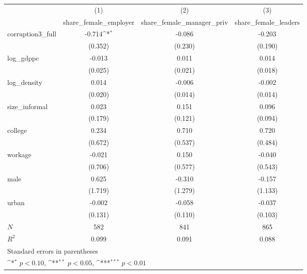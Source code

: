 {
\def\sym#1{\ifmmode^{#1}\else\(^{#1}\)\fi}
\begin{tabular}{l*{3}{c}}
\hline\hline
            &\multicolumn{1}{c}{(1)}&\multicolumn{1}{c}{(2)}&\multicolumn{1}{c}{(3)}\\
            &\multicolumn{1}{c}{share\_female\_employer}&\multicolumn{1}{c}{share\_female\_manager\_priv}&\multicolumn{1}{c}{share\_female\_leaders}\\
\hline
corruption3\_full&      -0.714\sym{*}  &      -0.086         &      -0.203         \\
            &     (0.352)         &     (0.230)         &     (0.190)         \\
[1em]
log\_gdppc   &      -0.013         &       0.011         &       0.014         \\
            &     (0.025)         &     (0.021)         &     (0.018)         \\
[1em]
log\_density &       0.014         &      -0.006         &      -0.002         \\
            &     (0.020)         &     (0.014)         &     (0.014)         \\
[1em]
size\_informal&       0.023         &       0.151         &       0.096         \\
            &     (0.179)         &     (0.121)         &     (0.094)         \\
[1em]
college     &       0.234         &       0.710         &       0.720         \\
            &     (0.672)         &     (0.537)         &     (0.484)         \\
[1em]
workage     &      -0.021         &       0.150         &      -0.040         \\
            &     (0.706)         &     (0.577)         &     (0.543)         \\
[1em]
male        &       0.625         &      -0.310         &      -0.157         \\
            &     (1.719)         &     (1.279)         &     (1.133)         \\
[1em]
urban       &      -0.002         &      -0.058         &      -0.037         \\
            &     (0.131)         &     (0.110)         &     (0.103)         \\
\hline
\(N\)       &         582         &         841         &         865         \\
\(R^{2}\)   &       0.099         &       0.091         &       0.088         \\
\hline\hline
\multicolumn{4}{l}{\footnotesize Standard errors in parentheses}\\
\multicolumn{4}{l}{\footnotesize \sym{*} \(p<0.10\), \sym{**} \(p<0.05\), \sym{***} \(p<0.01\)}\\
\end{tabular}
}
